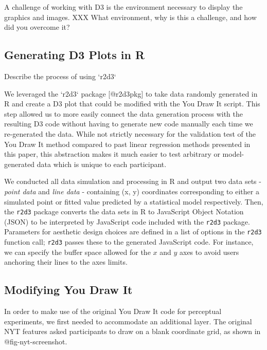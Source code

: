 \documentclass[
  letterpaper,
  DIV=11,
  numbers=noendperiod]{scrartcl}
\newcommand{\svp}[1]{{\textcolor{RedOrange}{#1}}}
\begin{document}
A challenge of working with D3 is the environment necessary to display
the graphics and images.
\svp{XXX What environment, why is this a challenge, and how did you overcome it?}

\hypertarget{generating-d3-plots-in-r}{%
\subsection{Generating D3 Plots in R}\label{generating-d3-plots-in-r}}

\svp{Describe the process of using `r2d3`}

\svp{We leveraged the `r2d3` package [@r2d3pkg] to take data randomly generated in R and create a D3 plot that could be modified with the You Draw It script. This step allowed us to more easily connect the data generation process with the resulting D3 code without having to generate new code manually each time we re-generated the data. While not strictly necessary for the validation test of the You Draw It method compared to past linear regression methods presented in this paper, this abstraction makes it much easier to test arbitrary or model-generated data which is unique to each participant.}

We conducted all data simulation and processing in R and output two data
sets - \emph{point data} and \emph{line data} - containing (x, y)
coordinates corresponding to either a simulated point or fitted value
predicted by a statistical model respectively. Then, the \texttt{r2d3}
package converts the data sets in R to JavaScript Object Notation (JSON)
to be interpreted by JavaScript code included with the \texttt{r2d3}
package. Parameters for aesthetic design choices are defined in a list
of options in the \texttt{r2d3} function call; \texttt{r2d3} passes
these to the generated JavaScript code. For instance, we can specify the
buffer space allowed for the \(x\) and \(y\) axes to avoid users
\svp{anchoring} their lines to the axes limits.

\hypertarget{modifying-you-draw-it}{%
\subsection{Modifying You Draw It}\label{modifying-you-draw-it}}

\svp{
In order to make use of the original You Draw It code for perceptual experiments, we first needed to accommodate an additional layer. The original NYT features asked participants to draw on a blank coordinate grid, as shown in @fig-nyt-screenshot.
}
\end{document}
